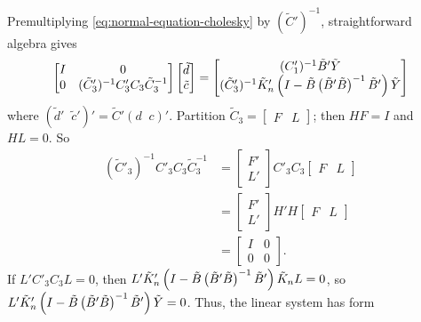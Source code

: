 Premultiplying \eqref{eq:normal-equation-cholesky} by $(\tilde{C}')^{-1}$, straightforward algebra gives 
\begin{equation} \label{eq:vectorized-normal-equations-cholesky}
\begin{bmatrix}
I & 0 \\
0 & (\tilde{C}'_3)^{-1} C'_3 C_3 \tilde{C}_3^{-1}\\
\end{bmatrix}
\begin{bmatrix}
\tilde{d}\\
\tilde{c}\\
\end{bmatrix}
= \begin{bmatrix}
(C'_1)^{-1} \tilde{B}'\tilde{Y} \\
(\tilde{C}'_3)^{-1} \tilde{K}_n'\left( I - \tilde{B}\left( \tilde{B}' \tilde{B} \right)^{-1} \tilde{B}' \right) \tilde{Y}\\
\end{bmatrix}
\end{equation}
\noindent
where $\left( \tilde{d}'\;\;\tilde{c}' \right)' =  \tilde{C}' \left( d\;\;c \right)'$. Partition $\tilde{C}_3 = \begin{bmatrix} F &  L\end{bmatrix}$; then $HF = I$ and $HL = 0$. So
\begin{align*}
(\tilde{C}'_3)^{-1} C'_3 C_3 \tilde{C}_3^{-1} &= \begin{bmatrix} F' \\ L' \end{bmatrix} C'_3C_3 \begin{bmatrix} F &  L\end{bmatrix} \\
&= \begin{bmatrix} F' \\ L' \end{bmatrix} H'H \begin{bmatrix} F &  L\end{bmatrix} \\
&= \begin{bmatrix} I & 0 \\ 0 & 0 \end{bmatrix}.
\end{align*}
\noindent
If $L'C'_3 C_3 L = 0$, then $L'\tilde{K}_n'\left( I - \tilde{B}\left( \tilde{B}' \tilde{B} \right)^{-1} \tilde{B}' \right)\tilde{K}_n L = 0$, so $L'\tilde{K}_n'\left( I - \tilde{B}\left( \tilde{B}' \tilde{B} \right)^{-1} \tilde{B}' \right) \tilde{Y} = 0$. Thus, the linear system has form
